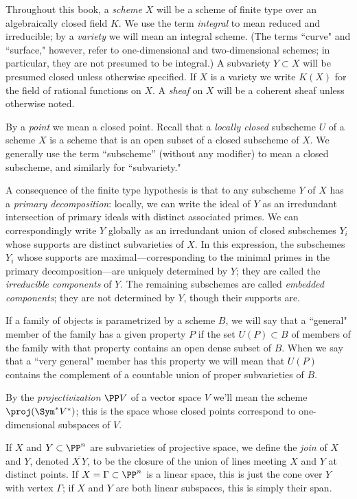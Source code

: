Throughout this book, a \emph{scheme} $X$ will be a scheme of finite type over an algebraically closed field
$K$. We use the term \emph{integral} to mean reduced and irreducible; by a \emph{variety} we will mean an integral scheme. (The terms ``curve" and ``surface," however, refer to one-dimensional and two-dimensional schemes; in particular, they are not presumed to be integral.) A subvariety $Y \subset X$ will be presumed closed unless otherwise specified.
 If $X$ is a variety we write $K(X)$ for the field of rational functions on $X$. A \emph{sheaf} on $X$ will be a coherent sheaf unless otherwise noted.
 
By a \emph{point}
we mean a closed point. 
Recall that a \emph{locally closed} subscheme $U$ of a scheme $X$ is 
a scheme that is an open subset of a closed subscheme of $X$. We generally use the term
``subscheme'' (without any modifier) to mean a closed subscheme, and similarly for ``subvariety."

A consequence of the finite type hypothesis
is that to any subscheme $Y$ of 
$X$ has a \emph{primary decomposition}: locally, we can write the ideal of $Y$ as an irredundant intersection of primary ideals with distinct associated primes. We can correspondingly write $Y$ globally as an irredundant union of closed subschemes $Y_i$ whose supports are distinct subvarieties of $X$. In this expression, the subschemes $Y_i$ whose supports are maximal---corresponding to the minimal primes in the primary decomposition---are uniquely determined by $Y$; they are called the \emph{irreducible components} of $Y$. The remaining subschemes are called \emph{embedded components}; they are not determined by $Y$, though their supports are.

If a family of objects is parametrized by a scheme $B$, we will say that a ``general" member of the family has a given property $P$ if the set $U(P) \subset B$ of members of the family with that property contains an open dense subset of $B$. When we say that a ``very general" member has this property  we will mean that $U(P)$ contains the complement of a countable union of proper subvarieties of $B$.


By the \emph{projectivization} $\PP V$ of a vector space $V$ we'll mean the scheme $\proj(\Sym^* V^*)$; this is the space whose closed points correspond to one-dimensional subspaces of $V$.

If $X$ and $Y \subset \PP^n$ are subvarieties of projective space, we define the \emph{join} of $X$ and $Y$, denoted $\overline{X\,Y}$, to be the closure of the union of lines meeting $X$ and $Y$ at distinct points. If $X = \Gamma \subset \PP^n$ is a linear space, this is just the cone over $Y$ with vertex $\Gamma$; if $X$ and $Y$ are both linear subspaces, this is simply their span.

